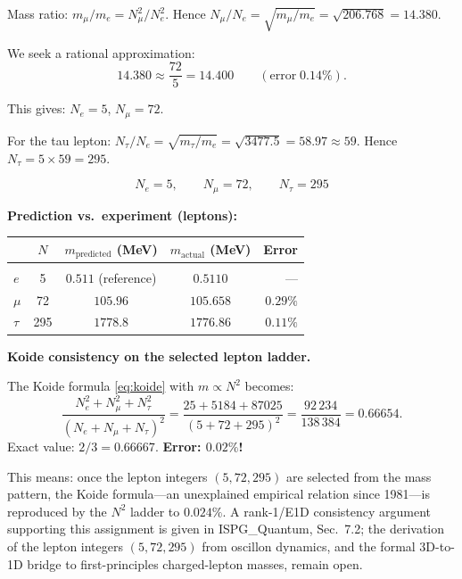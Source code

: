 \documentclass[11pt]{article}
\begin{document}
Mass ratio: $m_\mu/m_e = N_\mu^2/N_e^2$.
Hence $N_\mu/N_e = \sqrt{m_\mu/m_e}
= \sqrt{206.768} = 14.380$.

We seek a rational approximation:
\begin{equation}
  14.380 \approx \frac{72}{5} = 14.400
  \qquad(\text{error}\;0.14\%).
  \label{eq:mu_ratio_approx}
\end{equation}

This gives: $N_e = 5$, $N_\mu = 72$.

For the tau lepton:
$N_\tau/N_e = \sqrt{m_\tau/m_e} = \sqrt{3477.5}
= 58.97 \approx 59$.
Hence $N_\tau = 5 \times 59 = 295$.

\begin{equation}
  \boxed{N_e = 5, \qquad N_\mu = 72, \qquad N_\tau = 295}
  \label{eq:lepton_N}
\end{equation}

\medskip
\textbf{Prediction vs.\ experiment (leptons):}

\begin{center}
\renewcommand{\arraystretch}{1.3}
\begin{tabular}{@{}lcccr@{}}
  & $N$ & $m_{\mathrm{predicted}}$ (MeV)
  & $m_{\mathrm{actual}}$ (MeV) & Error \\[2pt]
\hline\\[-6pt]
$e$ & 5 & $0.511$ (reference) & $0.5110$ & --- \\
$\mu$ & 72 & $105.96$ & $105.658$ & $0.29\%$ \\
$\tau$ & 295 & $1778.8$ & $1776.86$ & $0.11\%$ \\
\end{tabular}
\end{center}

\medskip
\textbf{Koide consistency on the selected lepton ladder.}

The Koide formula \eqref{eq:koide} with $m \propto N^2$ becomes:
\begin{equation}
  \frac{N_e^2 + N_\mu^2 + N_\tau^2}
       {(N_e + N_\mu + N_\tau)^2}
  = \frac{25 + 5184 + 87025}{(5 + 72 + 295)^2}
  = \frac{92\,234}{138\,384}
  = 0.66654.
  \label{eq:koide_from_N}
\end{equation}
Exact value: $2/3 = 0.66667$.
\textbf{Error: $0.02\%$!}

This means: once the lepton integers $(5, 72, 295)$ are
selected from the mass pattern, the Koide formula---an
unexplained empirical relation since 1981---is reproduced by
the $N^2$ ladder to $0.024\%$.  A rank-1/E1D consistency
argument supporting this assignment is given in
ISPG\_Quantum, Sec.~7.2; the derivation of the lepton
integers $(5, 72, 295)$ from oscillon dynamics, and the
formal 3D-to-1D bridge to first-principles charged-lepton
masses, remain open.
\end{document}
